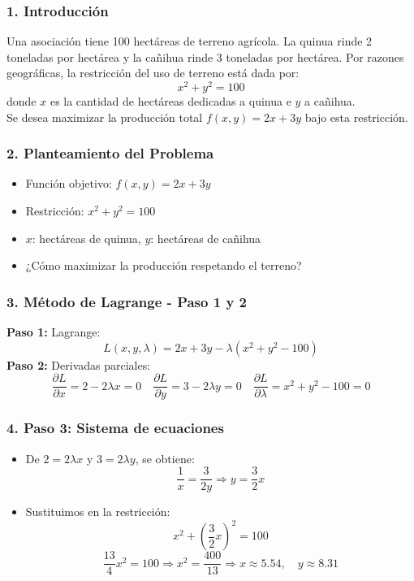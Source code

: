 \documentclass{beamer}
\begin{document}
\begin{frame}
\frametitle{1. Introducción}
Una asociación tiene 100 hectáreas de terreno agrícola. La quinua rinde 2 toneladas por hectárea y la cañihua rinde 3 toneladas por hectárea. 
Por razones geográficas, la restricción del uso de terreno está dada por:
\[
x^2 + y^2 = 100
\]
donde $x$ es la cantidad de hectáreas dedicadas a quinua e $y$ a cañihua.\\

Se desea maximizar la producción total $f(x, y) = 2x + 3y$ bajo esta restricción.
\end{frame}

\begin{frame}
\frametitle{2. Planteamiento del Problema}
\begin{itemize}
    \item Función objetivo: $f(x, y) = 2x + 3y$
    \item Restricción: $x^2 + y^2 = 100$
    \item $x$: hectáreas de quinua, $y$: hectáreas de cañihua
    \item ¿Cómo maximizar la producción respetando el terreno?
\end{itemize}
\end{frame}

\begin{frame}
\frametitle{3. Método de Lagrange - Paso 1 y 2}
\textbf{Paso 1:} Lagrange:
\[
L(x, y, \lambda) = 2x + 3y - \lambda(x^2 + y^2 - 100)
\]
\vspace{0.4cm}
\textbf{Paso 2:} Derivadas parciales:
\[
\frac{\partial L}{\partial x} = 2 - 2\lambda x = 0 \quad 
\frac{\partial L}{\partial y} = 3 - 2\lambda y = 0 \quad 
\frac{\partial L}{\partial \lambda} = x^2 + y^2 - 100 = 0
\]
\end{frame}

\begin{frame}
\frametitle{4. Paso 3: Sistema de ecuaciones}
\begin{itemize}
    \item De $2 = 2\lambda x$ y $3 = 2\lambda y$, se obtiene:
    \[
    \frac{1}{x} = \frac{3}{2y} \Rightarrow y = \frac{3}{2}x
    \]
    \item Sustituimos en la restricción:
    \[
    x^2 + \left(\frac{3}{2}x\right)^2 = 100
    \]
    \[
    \frac{13}{4}x^2 = 100 \Rightarrow x^2 = \frac{400}{13}
    \Rightarrow x \approx 5.54, \quad y \approx 8.31
    \]
\end{itemize}
\end{frame}
\end{document}
